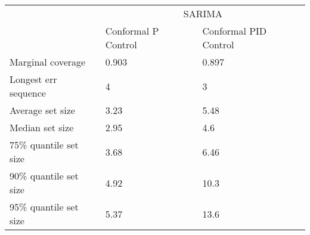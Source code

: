 \begin{tabular}{lll}
\toprule
& \multicolumn{2}{c}{SARIMA} \\
& Conformal P Control & Conformal PID Control \\
\midrule
Marginal coverage & 0.903 & 0.897 \\
Longest err sequence & 4 & 3 \\
Average set size & 3.23 & 5.48 \\
Median set size & 2.95 & 4.6 \\
75\% quantile set size & 3.68 & 6.46 \\
90\% quantile set size & 4.92 & 10.3 \\
95\% quantile set size & 5.37 & 13.6 \\
\bottomrule
\end{tabular}
